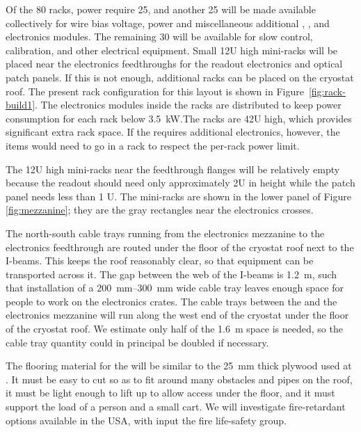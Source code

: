 Of the 80 racks,   power require \num{25}, and another 25 will be made available collectively for   wire bias voltage,  power and miscellaneous additional , , and   electronics modules. The remaining 30 will be available for slow control, calibration, and other electrical equipment. Small 12U high mini-racks will  be placed near the electronics feedthroughs for the  readout electronics and optical patch panels. If this is not enough, additional racks can be placed on the cryostat roof. The present rack configuration for this layout is shown in Figure~\ref{fig:rack-build1}. 
 The electronics modules inside the racks are distributed to keep power consumption for each rack below \SI{3.5}{kW}.The racks are 42U high, which provides significant extra rack space.  If the  requires additional electronics, however, the items would need to go in a  rack to respect the per-rack power limit.

The 12U high mini-racks near the feedthrough flanges will be relatively empty because the  readout should need only approximately 2U in height while the  patch panel needs less than 1 U. The mini-racks are shown in the lower panel of Figure \ref{fig:mezzanine}; %
they are the gray rectangles near the electronics crosses.

The north-south cable trays  running from the electronics mezzanine to the electronics feedthrough are routed under the floor of the cryostat roof next to the %
I-beams. This keeps the roof reasonably clear, so that equipment can be transported across it. %
The gap between the web of the I-beams is \SI{1.2}{m}, such that %
installation of a \SIrange{200}{300}{mm} wide cable tray %
leaves enough space %
for people to work on the electronics crates. 
The cable trays between the  and the electronics mezzanine will run along the west end of the cryostat under the floor of the cryostat roof. 
We estimate only half of the \SI{1.6}{m} space is needed, so the cable tray quantity could in principal be doubled if necessary. 

The flooring material for the  %
will be similar to the \SI{25}{mm} thick plywood used at . %
It must be easy to cut so as to fit around many obstacles and pipes on the roof, it must be light enough to lift up to allow access under the floor, and it must support the load of a person %
and a small cart. 
We will investigate %
fire-retardant options available %
in the USA, %
with input the  fire life-safety group. 

